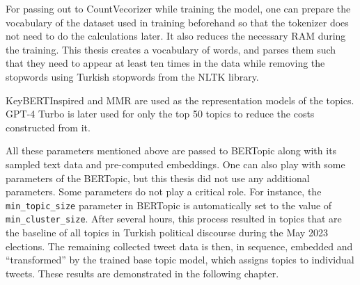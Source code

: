 For passing out to CountVecorizer while training the model, one can prepare the vocabulary 
of the dataset used in training beforehand so that the tokenizer does not need to do the 
calculations later. It also reduces the necessary RAM during the training. This thesis 
creates a vocabulary of words, and parses them such that they need to appear at least ten 
times in the data while removing the stopwords using Turkish stopwords from the NLTK library. 

KeyBERTInspired and \ac{MMR} are used as the representation models of the topics. GPT-4 Turbo is later 
used for only the top 50 topics to reduce the costs constructed from it. 

All these parameters mentioned above are passed to BERTopic along with its sampled text 
data and pre-computed embeddings. One can also play with some parameters of the BERTopic, 
but this thesis did not use any additional parameters. Some parameters do not play a 
critical role. For instance, the \texttt{min\_topic\_size} parameter in BERTopic is automatically 
set to the value of \texttt{min\_cluster\_size}. After several hours, this process resulted in 
topics that are the baseline of all topics in Turkish political discourse during the May 
2023 elections. The remaining collected tweet data is then, in sequence, embedded and 
``transformed'' by the trained base topic model, which assigns topics to individual tweets. 
These results are demonstrated in the following chapter.

